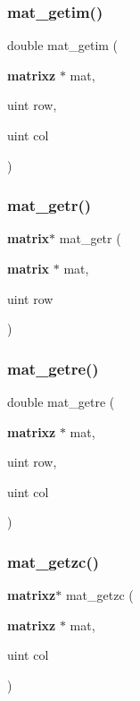 \mbox{\label{mat_lib_8h_a317b1aaaf9c8034238e650f962c623a0}} 
\subsubsection{mat\+\_\+getim()}
{\footnotesize\ttfamily double mat\+\_\+getim (\begin{DoxyParamCaption}\item[{\textbf{ matrixz} $\ast$}]{mat,  }\item[{uint}]{row,  }\item[{uint}]{col }\end{DoxyParamCaption})}

\mbox{\label{mat_lib_8h_a9631c3d951317b32d42457a3a36b909c}} 
\subsubsection{mat\+\_\+getr()}
{\footnotesize\ttfamily \textbf{ matrix}$\ast$ mat\+\_\+getr (\begin{DoxyParamCaption}\item[{\textbf{ matrix} $\ast$}]{mat,  }\item[{uint}]{row }\end{DoxyParamCaption})}

\mbox{\label{mat_lib_8h_acfb7fcf58416c91781ad87b4f04ccc67}} 
\subsubsection{mat\+\_\+getre()}
{\footnotesize\ttfamily double mat\+\_\+getre (\begin{DoxyParamCaption}\item[{\textbf{ matrixz} $\ast$}]{mat,  }\item[{uint}]{row,  }\item[{uint}]{col }\end{DoxyParamCaption})}

\mbox{\label{mat_lib_8h_afd59fff43213abbbce516bca82a64b14}} 
\subsubsection{mat\+\_\+getzc()}
{\footnotesize\ttfamily \textbf{ matrixz}$\ast$ mat\+\_\+getzc (\begin{DoxyParamCaption}\item[{\textbf{ matrixz} $\ast$}]{mat,  }\item[{uint}]{col }\end{DoxyParamCaption})}

